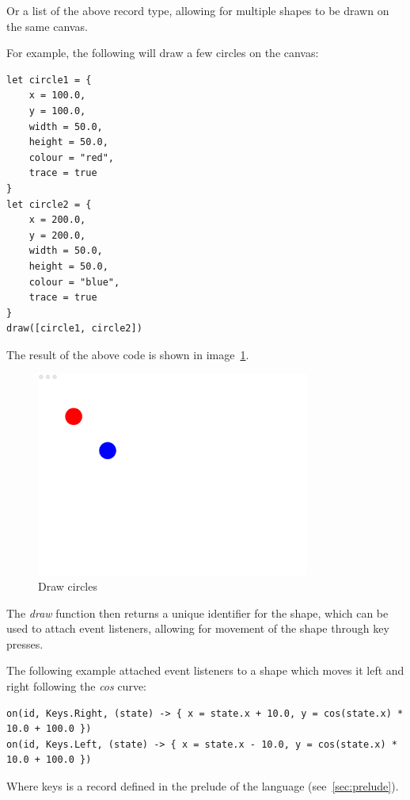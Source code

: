Or a list of the above record type, allowing for multiple shapes to be drawn on the same canvas.

For example, the following will draw a few circles on the canvas:

\begin{verbatim}
let circle1 = {
    x = 100.0,
    y = 100.0,
    width = 50.0,
    height = 50.0,
    colour = "red",
    trace = true
}
let circle2 = {
    x = 200.0,
    y = 200.0,
    width = 50.0,
    height = 50.0,
    colour = "blue",
    trace = true
}
draw([circle1, circle2])
\end{verbatim}

The result of the above code is shown in image~\ref{fig:draw-circles}.

\begin{figure}[H]
    \centering
    \includegraphics[width=0.8\textwidth]{assets/drawImage}
    \caption{Draw circles}\label{fig:draw-circles}
\end{figure}

The \textit{draw} function then returns a unique identifier for the shape, which can be used to attach event 
listeners, allowing for movement of the shape through key presses.

The following example attached event listeners to a shape which moves it left and right following the \textit{cos} curve:

\begin{verbatim}
on(id, Keys.Right, (state) -> { x = state.x + 10.0, y = cos(state.x) * 10.0 + 100.0 })
on(id, Keys.Left, (state) -> { x = state.x - 10.0, y = cos(state.x) * 10.0 + 100.0 })
\end{verbatim}

Where keys is a record defined in the prelude of the language (see~\autoref{sec:prelude}).


